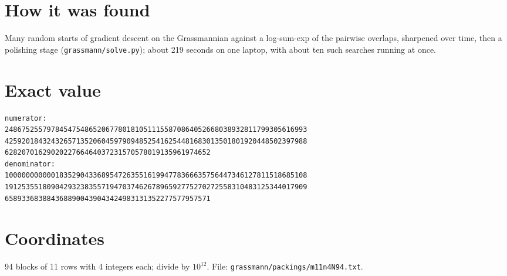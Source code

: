 \documentclass[11pt,a4paper]{article}
\begin{document}
\section{How it was found}
Many random starts of gradient descent on the Grassmannian against a log-sum-exp of the pairwise overlaps, sharpened over time, then a polishing stage (\texttt{grassmann/solve.py}); about 219 seconds on one laptop, with about ten such searches running at once.


\appendix
\section{Exact value}
{\small
\begin{verbatim}
numerator:
248675255797845475486520677801810511155870864052668038932811799305616993
425920184324326571352060459790948525416254481683013501801920448502397988
6282070162902022766464037231570578019135961974652
denominator:
100000000000183529043368954726355161994778366635756447346127811518685108
191253551809042932383557194703746267896592775270272558310483125344017909
6589336838843688900439043424983131352277577957571
\end{verbatim}}

\section{Coordinates}
94 blocks of 11 rows with 4 integers each; divide by $10^{12}$. File: \texttt{grassmann/packings/m11n4N94.txt}.
{\tiny
\begin{multicols}{3}
\end{multicols}}
\end{document}
